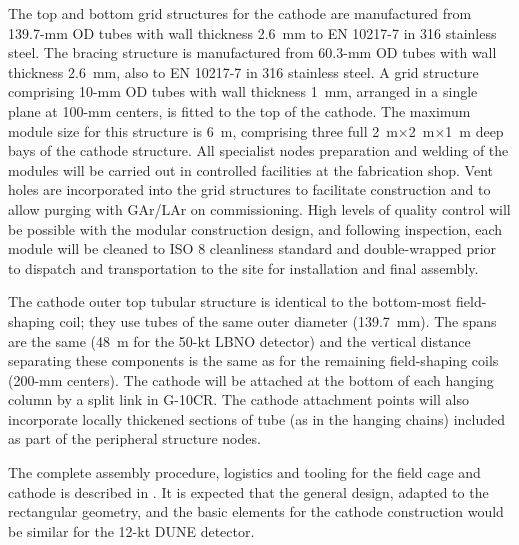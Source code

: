 The top and bottom grid structures for the cathode are manufactured from 139.7-mm OD
tubes with wall thickness 2.6~mm to EN 10217-7 in 316 stainless steel.
The bracing structure is manufactured from 60.3-mm OD tubes with wall
thickness 2.6~mm, also to EN 10217-7 in 316 stainless steel.  A grid
structure comprising 10-mm OD tubes with wall thickness 1~mm, arranged
in a single plane at 100-mm centers, is fitted to the top of the
cathode. %
The maximum module size for this structure is 6~m,
comprising three full 2~m$\times$2~m$\times$1~m deep bays of the
cathode structure.  All specialist nodes  preparation and welding of
the modules will be carried out in controlled facilities at the
fabrication shop.  Vent holes are incorporated into the grid structures to
facilitate construction and to allow purging with GAr/LAr on
commissioning. High levels of quality control will be possible with
the modular construction design, and following inspection, each module
will be cleaned to ISO 8 cleanliness standard and double-wrapped prior
to dispatch and transportation to the site for installation and final
assembly.

The cathode outer top tubular structure is identical to the bottom-most
field-shaping coil; they use tubes of the same outer diameter
(139.7~mm).  The spans are the same (48~m for the 50-kt LBNO detector)
and the vertical distance separating these components is the same as
for the remaining field-shaping coils (200-mm centers). The cathode
will be attached at the bottom of each hanging column by a split link
in G-10CR. The cathode attachment points will also incorporate locally
thickened sections of tube (as in the hanging chains) included as part
of the peripheral structure nodes.
 
The complete assembly procedure, logistics and tooling for the field
cage and cathode is described in \anxlbnob.  It is expected that the
general design, adapted to the rectangular geometry, and the basic
elements for the cathode construction would be similar for the 12-kt
DUNE detector. %
